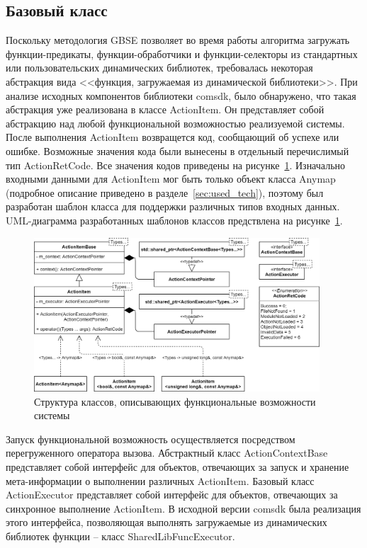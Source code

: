 \subsection{Базовый класс}
Поскольку методология GBSE позволяет во время работы алгоритма загружать функции-предикаты, функции-обработчики и функции-селекторы из стандартных или пользовательских динамических библиотек, требовалась некоторая абстракция вида <<функция, загружаемая из динамической библиотеки>>. При анализе исходных компонентов библиотеки comsdk, было обнаружено, что такая абстракция уже реализована в классе \textsf{ActionItem}. Он представляет собой абстракцию над любой функциональной возможностью реализуемой системы. После выполнения \textsf{ActionItem} возвращется код, сообщающий об успехе или ошибке. Возможные значения кода были вынесены в отдельный перечислимый тип \textsf{ActionRetCode}. Все значения кодов приведены на рисунке~\ref{fig:UMLActionItems}. Изначально входными данными для \textsf{ActionItem} мог быть только объект класса \textsf{Anymap} (подробное описание приведено в разделе~\ref{sec:used_tech}), поэтому был разработан шаблон класса для поддержки различных типов входных данных. UML-диаграмма разработанных шаблонов классов предствлена на рисунке~\ref{fig:UMLActionItems}.
\begin{figure}[!ht]
    \centering
    \includegraphics[width=0.95\textwidth]{figures/UML.actionItem.png}
    \caption{Структура классов, описывающих функциональные возможности системы}
    \label{fig:UMLActionItems}
\end{figure}

Запуск функциональной возможность осуществляется посредством перегруженного оператора вызова. Абстрактный класс \textsf{ActionContextBase} представляет собой интерфейс для объектов, отвечающих за запуск и хранение мета-информации о выполнении различных \textsf{ActionItem}. Базовый класс \textsf{ActionExecutor} представляет собой интерфейс для объектов, отвечающих за синхронное выполнение \textsf{ActionItem}. В исходной версии comsdk была реализация этого интерфейса, позволяющая выполнять загружаемые из динамических библиотек функции -- класс \textsf{SharedLibFuncExecutor}.

